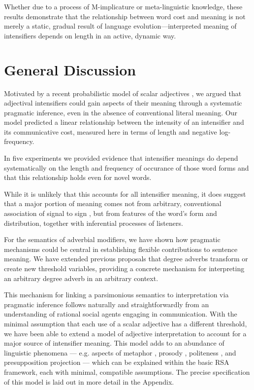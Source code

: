 \documentclass[10pt,letterpaper]{article}
\begin{document}
Whether due to a process of M-implicature or meta-linguistic knowledge, these results demonstrate that the relationship between word cost and meaning is not merely a static, gradual result of language evolution---interpreted meaning of intensifiers depends on length in an active, dynamic way.

\section{General Discussion}

Motivated by a recent probabilistic model of scalar adjectives \cite{lassiter_context_2013}, we argued that adjectival intensifiers could gain aspects of their meaning through a systematic pragmatic inference, even in the absence of conventional literal meaning.
Our model predicted a linear relationship between the intensity of an intensifier and its communicative cost, measured here in terms of length and negative log-frequency.

In five experiments we provided evidence that intensifier meanings do depend systematically on the length and frequency of occurance of those word forms and that this relationship holds even for novel words.

While it is unlikely that this accounts for all intensifier meaning, it does suggest that a major portion of meaning comes not from arbitrary, conventional association of signal to sign \cite{de_saussure_nature_1916}, but from features of the word's form and distribution, together with inferential processes of listeners.

For the semantics of adverbial modifiers, we have shown how pragmatic mechanisms could be central in establishing flexible contributions to sentence meaning.
We have extended previous proposals that degree adverbs transform or create new threshold variables, providing a concrete mechanism for interpreting an arbitrary degree adverb in an arbitrary context.

This mechanism for linking a parsimonious semantics to interpretation via pragmatic inference follows naturally and straightforwardly from an understanding of rational social agents engaging in communication.
With the minimal assumption that each use of a scalar adjective has a different threshold, we have been able to extend a model of adjective interpretation to account for a major source of intensifier meaning.
This model adds to an abundance of linguistic phenomena --- e.g. aspects of metaphor \cite{kao_formalizing_2014}, prosody \cite{bergen_strategic_2015}, politeness \cite{yoon_i_2017}, and presupposition projection \cite{qing_rational_2016} --- which can be explained within the basic RSA framework, each with minimal, compatible assumptions.
The precise specification of this model is laid out in more detail in the Appendix.
\end{document}

